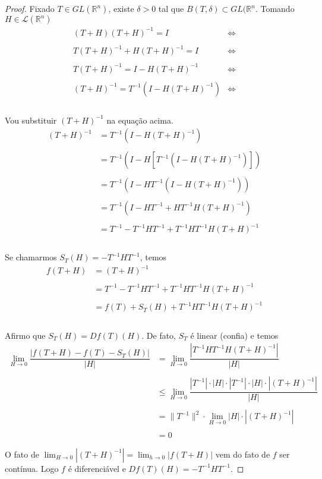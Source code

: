 \documentclass{article}
\theoremstyle{theorem}
\theoremstyle{lemma}
\theoremstyle{definition}
\theoremstyle{remark}
\begin{document}
	\begin{proof}
		Fixado \( T\in GL(\mathbb{R}^n) \), existe \(\delta >0 \) tal que \( B(T,\delta) \subset GL(\mathbb{R}^n \). Tomando \(H \in \mathcal{L}(\mathbb{R}^n ) \)    \begin{align*}
(T+H)(T+H)^{-1} = I &\iff \\~\\
T(T+H)^{-1} +H(T+H)^{-1} = I &\iff \\~\\
T(T+H)^{-1} = I -H(T+H)^{-1} &\iff \\~\\
(T+H)^{-1} = T^{-1}  ( I -H(T+H)^{-1} )  &\iff \\~\\
\end{align*}

Vou substituir $(T+H)^{-1}$ na equação acima.\begin{align*}
(T+H)^{-1} &= T^{-1}  ( I -H(T+H)^{-1} )   \\~\\
 &= T^{-1}  ( I -H \left[T^{-1}  ( I -H(T+H)^{-1} )\right])   \\~\\
 &= T^{-1}  ( I -H T^{-1}  ( I -H(T+H)^{-1} ))   \\~\\
 &= T^{-1}  ( I -H T^{-1}   +HT^{-1}H(T+H)^{-1} )   \\~\\
 &= T^{-1}   -T^{-1}H T^{-1}   +T^{-1}HT^{-1}H(T+H)^{-1}    \\~\\
\end{align*}

Se chamarmos $S_T(H) = -T^{-1}HT^{-1}$, temos \begin{align*}
f(T+H) &= (T+H)^{-1}    \\~\\
 &= T^{-1}   -T^{-1}H T^{-1}   +T^{-1}HT^{-1}H(T+H)^{-1}    \\~\\
 &= f(T)   +S_T(H)   +T^{-1}HT^{-1}H(T+H)^{-1}    \\~\\
\end{align*}

Afirmo que $S_T(H) = Df(T)(H)$. De fato, $S_T$ é linear (confia) e temos \begin{align*}
\displaystyle\lim_{H\to 0} \dfrac{| f(T+H) - f(T) - S_T(H)|}{|H|} &= \displaystyle\lim_{H\to 0}\dfrac{| T^{-1}HT^{-1}H(T+H)^{-1} |}{|H|} \\~\\
&\leq \displaystyle\lim_{H \to 0}\dfrac{|T^{-1}|\cdot |H|\cdot |T^{-1}| \cdot |H| \cdot |(T+H)^{-1}|}{|H|} \\~\\
&= \|T^{-1}\|^2\cdot \displaystyle\lim_{H \to 0}|H| \cdot |(T+H)^{-1}| \\~\\
&=0
\end{align*}

		O fato de \( \displaystyle \lim_{H\to 0} |(T+H)^{-1}| = \displaystyle \lim_{h \to 0} |f(T+H)| \) vem do fato de \( f\) ser contínua. Logo \(f\) é  diferenciável e \( Df(T)(H) = -T^{-1}HT^{-1}\).
	\end{proof}
\end{document}
